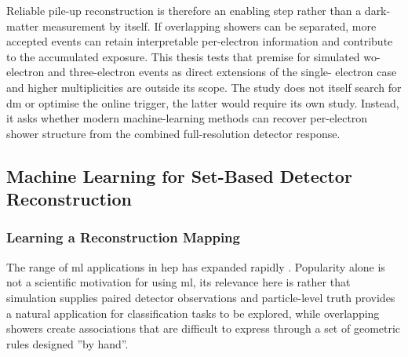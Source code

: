Reliable pile-up reconstruction is therefore an enabling step rather than a
dark-matter measurement by itself. If overlapping showers can be separated,
more accepted events can retain interpretable per-electron information and
contribute to the accumulated exposure. This thesis tests that premise for
simulated wo-electron and three-electron events as direct extensions of the single-
electron case and higher multiplicities are outside its scope. The study
does not itself search for \gls{dm} or optimise the online trigger, the latter would require its own study. Instead, it asks whether modern
machine-learning methods can recover per-electron shower structure from the
combined full-resolution detector response.


\subsection{Machine Learning for Set-Based Detector Reconstruction}
\label{sec:ml_set_reconstruction}


\subsubsection{Learning a Reconstruction Mapping}

The range of \gls{ml} applications in \gls{hep} has expanded
rapidly \cite{feickert2021-livingreview,iml-wg-hepml-livingreview}. Popularity
alone is not a scientific motivation for using \gls{ml}, its relevance here
is rather that simulation supplies paired detector observations and
particle-level truth provides a natural application for classification tasks to be explored, while overlapping showers create associations that are
difficult to express through a set of geometric rules designed ''by hand''. 


